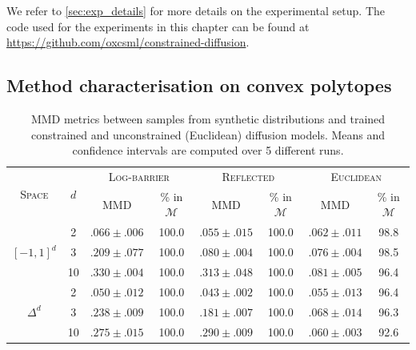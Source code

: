 We refer to \cref{sec:exp_details} for more details on the experimental setup.
The code used for the experiments in this chapter can be found at \url{https://github.com/oxcsml/constrained-diffusion}.

\subsection{Method characterisation on convex polytopes}
\label{subsec:synthetic_data}
\setlength{\tabcolsep}{11pt}
\begin{table}[t]
	\centering
	\caption{
		MMD metrics between samples from synthetic distributions and trained constrained and unconstrained (Euclidean) diffusion models.
		Means and confidence intervals are computed over 5 different runs.
	}
	\label{tab:synthetic_polytope}
	\begin{tabular}{cccccccc}
		\toprule
		\multirow{2}{*}{\scshape{Space}}      & \multirow{2}{*}{\(d\)} & \multicolumn{2}{c}{\scshape{Log-barrier}} & \multicolumn{2}{c}{\scshape{Reflected}} & \multicolumn{2}{c}{\scshape{Euclidean}}                                                                \\
		                            &                      & \textsc{MMD}                    & \% in \(\mathcal{M}\)           & \textsc{MMD}                  & \% in \(\mathcal{M}\) & \textsc{MMD}     & \% in \(\mathcal{M}\) \\
		\midrule
		\multirow{3}{*}{\([-1,1]^d\)} & 2                    & \(.066 \pm{.006}\)                & 100.0                         & \(.055 \pm{.015}\)              & 100.0               & \(.062 \pm{.011}\) & 98.8                \\
		                            & 3                    & \(.209 \pm{.077}\)                & 100.0                         & \(.080 \pm{.004}\)              & 100.0               & \(.076 \pm{.004}\) & 98.5                \\
		                            & 10                   & \(.330 \pm{.004}\)                & 100.0                         & \(.313 \pm{.048}\)              & 100.0               & \(.081 \pm{.005}\) & 96.4                \\
		\midrule
		\multirow{3}{*}{\(\Delta^d\)} & 2                    & \(.050 \pm{.012}\)                & 100.0                         & \(.043 \pm{.002}\)              & 100.0               & \(.055 \pm{.013}\) & 96.4                \\
		                            & 3                    & \(.238 \pm{.009}\)                & 100.0                         & \(.181 \pm{.007}\)              & 100.0               & \(.068\pm{.014}\)  & 96.3                \\
		                            & 10                   & \(.275 \pm{.015}\)                & 100.0                         & \(.290 \pm{.009}\)              & 100.0               & \(.060	\pm{.003}\) & 92.6                \\
		\bottomrule
	\end{tabular}
\end{table}

